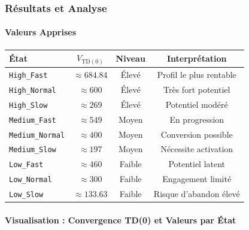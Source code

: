 \documentclass[11pt,a4paper]{article}
\begin{document}
\subsubsection{Résultats et Analyse}

\paragraph{Valeurs Apprises}

\begin{center}
\begin{tabular}{lccc}
\toprule
\rowcolor{LightBlue}
\textbf{État} & \textbf{$V_{\text{TD}(0)}$} & \textbf{Niveau} & \textbf{Interprétation} \\
\midrule
\texttt{High\_Fast}   & $\approx 684.84$ & \cellcolor{LightGreen}Élevé & Profil le plus rentable \\
\texttt{High\_Normal} & $\approx 600$ & \cellcolor{LightGreen}Élevé & Très fort potentiel \\
\texttt{High\_Slow}   & $\approx 269$ & \cellcolor{LightGreen}Élevé & Potentiel modéré \\
\texttt{Medium\_Fast} & $\approx 549$ & \cellcolor{LightOrange}Moyen & En progression \\
\texttt{Medium\_Normal}& $\approx 400$ & \cellcolor{LightOrange}Moyen & Conversion possible \\
\texttt{Medium\_Slow} & $\approx 197$ & \cellcolor{LightOrange}Moyen & Nécessite activation \\
\texttt{Low\_Fast}    & $\approx 460$ & \cellcolor{LightRed}Faible & Potentiel latent \\
\texttt{Low\_Normal}  & $\approx 300$ & \cellcolor{LightRed}Faible & Engagement limité \\
\texttt{Low\_Slow}    & $\approx 133.63$ & \cellcolor{LightRed}Faible & Risque d'abandon élevé \\
\bottomrule
\end{tabular}
\end{center}

\paragraph{Visualisation : Convergence TD(0) et Valeurs par État}
\end{document}
